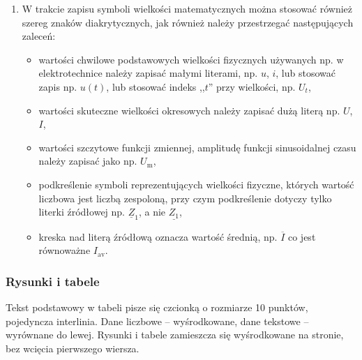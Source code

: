 \documentclass[12pt,twoside]{article}
\begin{document}
\begin{enumerate}[label=\arabic*), leftmargin=1.25cm]
\begin{itemize}[label=-,labelsep=0.4cm,leftmargin=0.6cm]
\end{itemize}

\item W trakcie zapisu symboli wielkości matematycznych można stosować również szereg znaków diakrytycznych, jak również należy przestrzegać następujących zaleceń:

\begin{itemize}[label=-,labelsep=0.4cm,leftmargin=0.6cm]
\item wartości chwilowe podstawowych wielkości fizycznych używanych np. w elektrotechnice należy zapisać małymi literami, np. $u$, $i$, lub stosować zapis np. $u(t)$, lub stosować indeks ,,$t$'' przy wielkości, np. $U_t$,

\item wartości skuteczne wielkości okresowych należy zapisać dużą literą np. $U$, $I$, 

\item wartości szczytowe funkcji zmiennej, amplitudę funkcji sinusoidalnej czasu należy zapisać jako np. $U_\mathrm{m}$,

\item podkreślenie symboli reprezentujących wielkości fizyczne, których wartość liczbowa jest liczbą zespoloną, przy czym podkreślenie dotyczy tylko literki źródłowej np. $\underline{Z}_1$, a nie $\underline{Z_1}$,

\item kreska nad literą źródłową oznacza wartość średnią, np. $\overline{I}$ co jest równoważne $I_\mathrm{av}$.

\end{itemize}

\end{enumerate}




\subsubsection{Rysunki i tabele} \label{Subsec:Rysunki-i-tabele}
Tekst podstawowy w tabeli pisze się czcionką o rozmiarze 10 punktów, pojedyncza interlinia. Dane liczbowe – wyśrodkowane, dane tekstowe – wyrównane do lewej. Rysunki i tabele zamieszcza się wyśrodkowane na stronie, bez wcięcia pierwszego wiersza.
\end{document}
